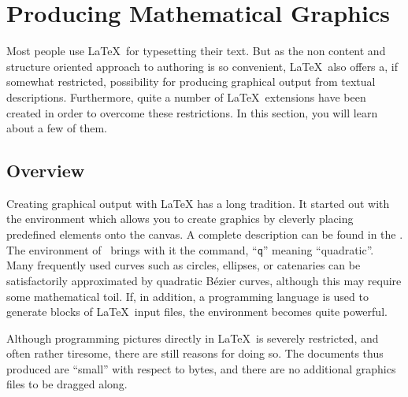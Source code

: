 \setcounter{chapter}{4}
\newcommand{\graphicscompanion}{\emph{The \LaTeX{} Graphics Companion}~\cite{graphicscompanion}} 
\newcommand{\hobby}{\emph{A User's Manual for \MP{}}~\cite{metapost}}
\newcommand{\hoenig}{\emph{\TeX{} Unbound}~\cite{unbound}}
\newcommand{\graphicsinlatex}{\emph{Graphics in \LaTeXe{}}~\cite{ursoswald}}

\chapter{Producing Mathematical Graphics}
\label{chap:graphics}

\begin{intro}
Most people use \LaTeX\ for typesetting their text. But as the non content and
structure oriented approach to authoring is so convenient, \LaTeX\ also offers a,
if somewhat restricted, possibility for producing graphical output from textual 
descriptions. Furthermore, quite a number of \LaTeX\ extensions have been created 
in order to overcome these restrictions. In this section, you will learn about a 
few of them.
\end{intro}

\section{Overview}

Creating graphical output with \LaTeX{} has a long tradition. It started out
with the  environment which allows you to create graphics by
cleverly placing predefined elements onto the canvas. A complete
description can be found in the \manual. The  environment of
\LaTeXe\ brings with it the  command, ``\texttt{q}'' meaning
``quadratic''.  Many frequently used curves such as circles, ellipses, or
catenaries can be satisfactorily approximated by quadratic B\'ezier curves,
although this may require some mathematical toil. If, in addition, a
programming language is used to generate  blocks of \LaTeX\
input files, the  environment becomes quite powerful.

Although programming pictures directly in \LaTeX\ is severely restricted,
and often rather tiresome, there are still reasons for doing so. The documents
thus produced are ``small'' with respect to bytes, and there are no additional
graphics files to be dragged along.

